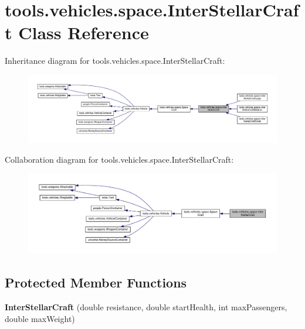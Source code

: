 \hypertarget{classtools_1_1vehicles_1_1space_1_1_inter_stellar_craft}{}\section{tools.\+vehicles.\+space.\+Inter\+Stellar\+Craft Class Reference}
\label{classtools_1_1vehicles_1_1space_1_1_inter_stellar_craft}


Inheritance diagram for tools.\+vehicles.\+space.\+Inter\+Stellar\+Craft\+:
\nopagebreak
\begin{figure}[H]
\begin{center}
\leavevmode
\includegraphics[width=350pt]{classtools_1_1vehicles_1_1space_1_1_inter_stellar_craft__inherit__graph}
\end{center}
\end{figure}


Collaboration diagram for tools.\+vehicles.\+space.\+Inter\+Stellar\+Craft\+:
\nopagebreak
\begin{figure}[H]
\begin{center}
\leavevmode
\includegraphics[width=350pt]{classtools_1_1vehicles_1_1space_1_1_inter_stellar_craft__coll__graph}
\end{center}
\end{figure}
\subsection*{Protected Member Functions}
\begin{DoxyCompactItemize}
\item 
{\bfseries Inter\+Stellar\+Craft} (double resistance, double start\+Health, int max\+Passengers, double max\+Weight)\hypertarget{classtools_1_1vehicles_1_1space_1_1_inter_stellar_craft_ab44f4f8d5c1aebb44995f9d7d8903e97}{}\label{classtools_1_1vehicles_1_1space_1_1_inter_stellar_craft_ab44f4f8d5c1aebb44995f9d7d8903e97}

\end{DoxyCompactItemize}
